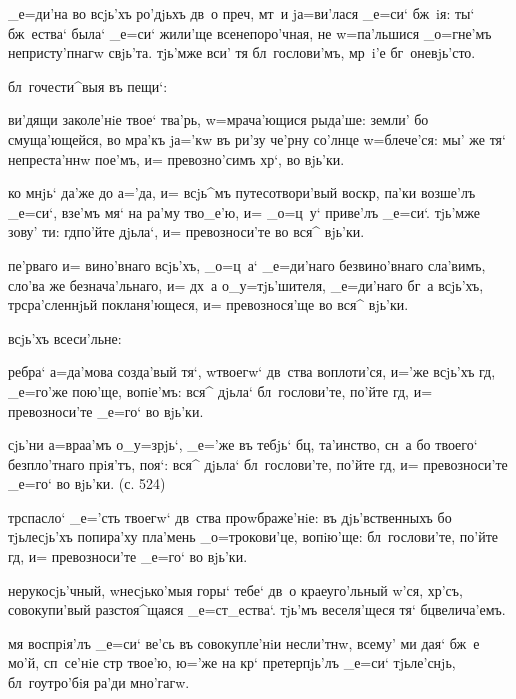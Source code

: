   _е=ди'на во всjь'хъ ро'дjьхъ 
дв~о преч, мт~и jа=ви'лася _е=си` бж~iя: ты` 
бж~ества` была` _е=си` жили'ще всенепоро'чная, не 
w=па'льшися _о=гне'мъ непристу'пнагw свjь'та. тjь'мже 
вси' тя бл~гослови'мъ, мр~i'е бг~оневjь'сто.

   бл~гочести^выя въ 
пещи`:

 ви'дящи заколе'нiе твое` тва'рь, 
w=мрача'ющися рыда'ше: земли' бо смуща'ющейся, во мра'къ 
jа='кw въ ри'зу че'рну со'лнце w=блече'ся: мы' же тя` 
непреста'ннw пое'мъ, и= превозно'симъ хр`, во вjь'ки.

 ко мнjь` да'же до а='да, и= всjь^мъ 
путесотвори'вый воскр, па'ки возше'лъ _е=си`, взе'мъ 
мя` на ра'му тво_е'ю, и= _о=ц~у` приве'лъ _е=си`. тjь'мже 
зову' ти: гд по'йте дjьла`, и= превозноси'те во вся^ 
вjь'ки.

  пе'рваго и= вино'внаго всjь'хъ, 
_о=ц~а` _е=ди'наго безвино'внаго сла'вимъ, сло'ва же 
безнача'льнаго, и= дх~а о_у=тjь'шителя, _е=ди'наго бг~а 
всjь'хъ, тр сра'сленнjьй покланя'ющеся, и= 
превознося'ще во вся^ вjь'ки.

   всjь'хъ всеси'льне:

 ребра` а=да'мова созда'вый тя`, w\т твоегw` 
дв~ства воплоти'ся, и='же всjь'хъ гд, _е=го'же пою'ще, 
вопiе'мъ: вся^ дjьла` бл~гослови'те, по'йте гд, и= 
превозноси'те _е=го` во вjь'ки.

 сjь'ни а=враа'мъ о_у=зрjь`, _е='же въ тебjь` 
бц, та'инство, сн~а бо твоего` безпло'тнаго прiя'тъ, 
поя`: вся^ дjьла` бл~гослови'те, по'йте гд, и= 
превозноси'те _е=го` во вjь'ки. (с. 524)

 тр спасло` _е='сть твоегw` 
дв~ства проwбраже'нiе: въ дjь'вственныхъ бо тjьлесjь'хъ 
попира'ху пла'мень _о=трокови'це, вопiю'ще: 
бл~гослови'те, по'йте гд, и= превозноси'те _е=го` во 
вjь'ки.


 нерукосjь'чный, w\т несjько'мыя 
горы` тебе` дв~о краеуго'льный w'ся, хр'съ, 
совокупи'вый разстоя^щаяся _е=ст_ества`. тjь'мъ 
веселя'щеся тя` бц велича'емъ.

 мя воспрiя'лъ _е=си` ве'сь въ совокупле'нiи 
несли'тнw, всему' ми дая` бж~е мо'й, сп~се'нiе стр 
твое'ю, ю='же на кр` претерпjь'лъ _е=си` тjьле'снjь, 
бл~гоутро'бiя ра'ди мно'гагw.

